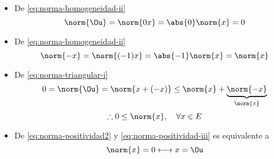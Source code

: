 \begin{itemize}
	\item De \eqref{eq:norma-homogeneidad-ii}
	      $$
		      \norm{\Ou} = \norm{0 x}=\abs{0}\norm{x} = 0
	      $$
	\item De \eqref{eq:norma-homogeneidad-ii}
	      $$
		      \norm{-x}=\norm{(-1)x}=\abs{-1}\norm{x}=\norm{x}
	      $$
	\item De \eqref{eq:norma-triangular-i}
	      $$
		      0 = \norm{\Ou} =\norm{x+(-x)} \leq \norm{x}+\underbrace{\norm{-x}}_{\norm{x}}
	      $$
	      \begin{equation}
		      \therefore 0\leq \norm{x}, \quad \forall x \in E
		      \label{eq:norma-positividad2}
	      \end{equation}
	\item  De \eqref{eq:norma-positividad2} y \eqref{eq:norma-positividad-iii} es equivalente a
	      $$
		      \norm{x} = 0 \longleftrightarrow x =\Ou
	      $$
\end{itemize}

